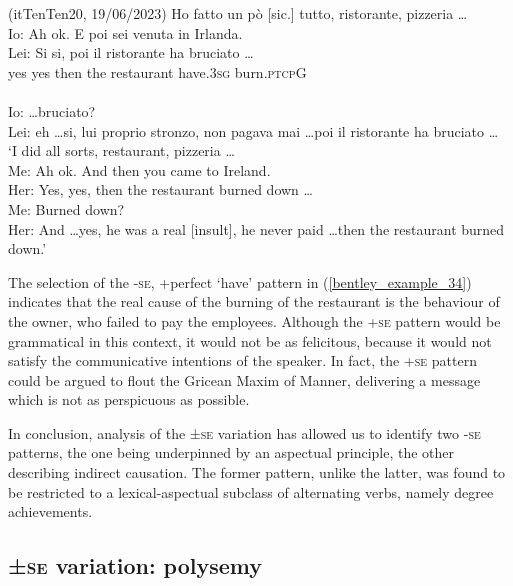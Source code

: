 \documentclass[output=paper,colorlinks,citecolor=brown
]{langscibook}
\begin{document}
\hspace*{\fill}(itTenTen20, 19/06/2023)\quad
\ea \label{bentley_example_34}
    Ho fatto un pò [sic.] tutto, ristorante, pizzeria \ldots  \\
    Io: Ah ok. E poi sei venuta in Irlanda. \\
    \gll Lei: Si			si,			poi			il		ristorante	ha						bruciato  \ldots    \\
    {} yes		yes		then		the	restaurant	have.3\textsc{sg}	burn.\textsc{ptcp}G {} \\ \\
    {Io:  \ldots bruciato?  }\\
    {Lei: eh \ldots si, lui proprio stronzo, non pagava mai \ldots  poi il ristorante ha bruciato \ldots } \\
    \glt 	‘I did all sorts, restaurant, pizzeria \ldots  \\
            Me:	Ah ok. And then you came to Ireland. \\
            Her:	Yes, yes, then the restaurant burned down \ldots  \\
            Me:	Burned down? \\
            		Her:	And \ldots  yes, he was a real [insult], he never paid \ldots  then the restaurant burned down.’
\z
   

The selection of the {-\textsc{se}, +perfect ‘have’} pattern in (\ref{bentley_example_34}) indicates that the real cause of the burning of the restaurant is the behaviour of the owner, who failed to pay the employees. Although the +\textsc{se} pattern would be grammatical in this context, it would not be as felicitous, because it would not satisfy the communicative intentions of the speaker. In fact, the +\textsc{se} pattern could be argued to flout the Gricean Maxim of Manner, delivering a message which is not as perspicuous as possible.

In conclusion, analysis of the ±\textsc{se} variation has allowed us to identify two -\textsc{se} patterns, the one being underpinned by an aspectual principle, the other describing indirect causation. The former pattern, unlike the latter, was found to be restricted to a lexical-aspectual subclass of alternating verbs, namely degree achievements.

\subsection{±\textsc{se} variation: polysemy}
\label{bentley_section_4.3}
\end{document}
